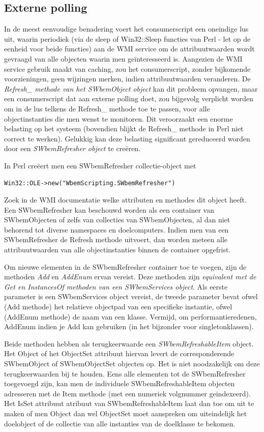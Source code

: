 \documentclass[11pt,a4paper]{report}
\begin{document}
\subsection{Externe polling}
In de meest eenvoudige benadering voert het consumerscript een oneindige lus uit, waarin periodiek (via de sleep of Win32::Sleep functies van Perl - let op de eenheid voor beide functies) aan de WMI service om de attribuutwaarden wordt gevraagd van alle objecten waarin men geïnteresseerd is. Aangezien de WMI service gebruik maakt van caching, zou het consumerscript, zonder bijkomende voorzieningen, geen wijzingen merken, indien attribuutwaarden veranderen. De \textit{Refresh\_ methode van het SWbemObject object} kan dit probleem opvangen, maar een consumerscript dat aan externe polling doet, zou bijgevolg verplicht worden om in de lus telkens de Refresh\_ methode toe te passen, voor alle objectinstanties die men wenst te monitoren. Dit veroorzaakt een enorme belasting op het systeem (bovendien blijkt de Refresh\_ methode in Perl niet correct te werken). Gelukkig kan deze belasting significant gereduceerd worden door een \textit{SWbemRefresher object} te creëren.
\par In Perl creëert men een SWbemRefresher collectie-object met
\begin{lstlisting}
Win32::OLE->new("WbemScripting.SWbemRefresher")
\end{lstlisting}
Zoek in de WMI documentatie welke attributen en methodes dit object heeft.
Een SWbemRefresher kan beschouwd worden als een container van SWbemObjecten of zelfs van collecties van SWbemObjecten, al dan niet behorend tot diverse namespaces en doelcomputers. Indien men van een SWbemRefresher de Refresh methode uitvoert, dan worden meteen alle attribuutwaarden van alle objectinstanties binnen de container opgefrist.
\par Om nieuwe elementen in de SWbemRefresher container toe te voegen, zijn de methoden \textit{Add} en \textit{AddEnum} ervan vereist. Deze methoden zijn \textit{equivalent met de Get en InstancesOf methoden van een SWbemServices object}. Als eerste parameter is een SWbemServices object vereist, de tweede parameter bevat ofwel (Add methode) het relatieve objectpad van een specifieke instantie, ofwel (AddEnum methode) de naam van een klasse. Vermijd, om performantieredenen, AddEnum indien je Add kan gebruiken (in het bijzonder voor singletonklassen).
\par Beide methoden hebben als terugkeerwaarde een \textit{SWbemRefreshableItem} object. Het Object of het ObjectSet attribuut hiervan levert de corresponderende SWbemObject of SWbemObjectSet objecten op. Het is niet noodzakelijk om deze terugkeerwaarden bij te houden. Eens alle elementen tot de SWbemRefresher toegevoegd zijn, kan men de individuele SWbemRefreshableItem objecten adresseren met de Item methode (met een numeriek volgnummer geindexeerd). Het IsSet attribuut atribuut van SWbemRefreshableItem laat dan toe om uit te maken of men Object dan wel ObjectSet moet aanspreken om uiteindelijk het doelobject of de collectie van alle instanties van de doelklasse te bekomen.
\end{document}
